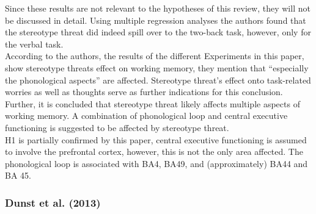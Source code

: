 \documentclass[
  stu,floatsintext]{apa7}
\begin{document}
Since these results are not relevant to the hypotheses of this review, they will not be discussed in detail.
Using multiple regression analyses the authors found that the stereotype threat did indeed spill over to the two-back task, however, only for the verbal task.\\
According to the authors, the results of the different Experiments in this paper, show stereotype threats effect on working memory, they mention that ``especially the phonological aspects'' are affected.
Stereotype threat's effect onto task-related worries as well as thoughts serve as further indications for this conclusion.
Further, it is concluded that stereotype threat likely affects multiple aspects of working memory.
A combination of phonological loop and central executive functioning is suggested to be affected by stereotype threat.\\
H1 is partially confirmed by this paper, central executive functioning is assumed to involve the prefrontal cortex, however, this is not the only area affected.
The phonological loop is associated with BA4, BA49, and (approximately) BA44 and BA 45.

\subsubsection{Dunst et al. (2013)}\label{dunstsexdifferencesneural2013}
\end{document}
